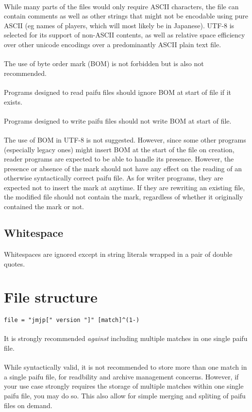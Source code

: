 \documentclass[%
	a4paper%
	,10pt%
	,twoside%
	,notitlepage%
]{article}%
\newcommand*{\ruleSymbol}{\textjapanese{⚠}}%
\newcommand*{\ruleMargin}{\marginpar{\flushright{}\ruleSymbol{}}}%
\newcommand*{\rulePar}{\paragraph*{\ruleMargin{}}}%
\begin{document}
		\paragraph*{}While many parts of the files would only require ASCII characters, the file can contain comments as well as other strings that might not be encodable using pure ASCII (eg names of players, which will most likely be in Japanese). UTF-8 is selected for its support of non-ASCII contents, as well as relative space efficiency over other unicode encodings over a predominantly ASCII plain text file. %
		\rulePar{}The use of byte order mark (BOM) is not forbidden but is also not recommended. %
		\rulePar{}Programs designed to read paifu files should ignore BOM at start of file if it exists. %
		\rulePar{}Programs designed to write paifu files should not write BOM at start of file. %
		\paragraph*{}The use of BOM in UTF-8 is not suggested. However, since some other programs (especially legacy ones) might insert BOM at the start of the file on creation, reader programs are expected to be able to handle its presence. However, the presence or absence of the mark should not have any effect on the reading of an otherwise syntactically correct paifu file. As for writer programs, they are expected not to insert the mark at anytime. If they are rewriting an existing file, the modified file should not contain the mark, regardless of whether it originally contained the mark or not. %
	\subsection{Whitespace}%
		\rulePar{}Whitespaces are ignored except in string literals wrapped in a pair of double quotes. %
\section{File structure}%
% 
	\rulePar{}\lstinline/file = "jmjp[" version "]" [match]^(1-)/%
	\rulePar{}It is strongly recommended \textit{against} including multiple matches in one single paifu file. %
	\paragraph*{}While syntactically valid, it is not recommended to store more than one match in a single paifu file, for readbility and archive management concerns. However, if your use case strongly requires the storage of multiple matches within one single paifu file, you may do so. This also allow for simple merging and spliting of paifu files on demand. %
\end{document}
